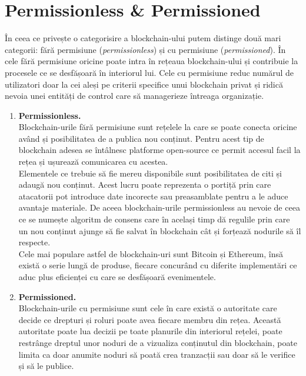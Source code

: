 \section{Permissionless \& Permissioned}
\hfill

În ceea ce privește o categorisire a blockchain-ului putem distinge două mari categorii: fără permisiune (\textit{permissionless}) și cu permisiune (\textit{permissioned}). În cele fără permisiune oricine poate intra în rețeaua blockchain-ului și contribuie la procesele ce se desfășoară în interiorul lui. Cele cu permisiune reduc numărul de utilizatori doar la cei aleși pe criterii specifice unui blockchain privat și  ridică nevoia unei entități de control care să managerieze întreaga organizație.\\

\begin{enumerate}
    \item \textbf{Permissionless.} \\
    
    Blockchain-urile fără permisiune sunt rețelele la care se poate conecta oricine având și posibilitatea de a publica nou conținut. Pentru acest tip de blockchain adesea se întâlnesc platforme open-source ce permit accesul facil la rețea și ușurează comunicarea cu acestea.\\
    
    Elementele ce trebuie să fie mereu disponibile sunt posibilitatea de citi și adaugă nou conținut. Acest lucru poate reprezenta o portiță prin care atacatorii pot introduce date incorecte sau preasamblate pentru a le aduce avantaje materiale. De aceea blockchain-urile permissionless au nevoie de ceea ce se numește algoritm de consens care în același timp dă regulile prin care un nou conținut ajunge să fie salvat în blockchain cât și forțează nodurile să îl respecte.\\
    
    Cele mai populare astfel de blockchain-uri sunt Bitcoin și Ethereum, însă există o serie lungă de produse, fiecare concurând cu diferite implementări ce aduc plus eficienței cu care se desfășoară evenimentele.\\
    
    \item \textbf{Permissioned.} \\
    
    Blockchain-urile cu permisiune sunt cele în care există o autoritate care decide ce drepturi și roluri poate avea fiecare membru din rețea. Această autoritate poate lua decizii pe toate planurile din interiorul rețelei, poate restrânge dreptul unor noduri de a vizualiza conținutul din blockchain, poate limita ca doar anumite noduri să poată crea tranzacții sau doar să le verifice și să le publice.\\
    

\end{enumerate}
